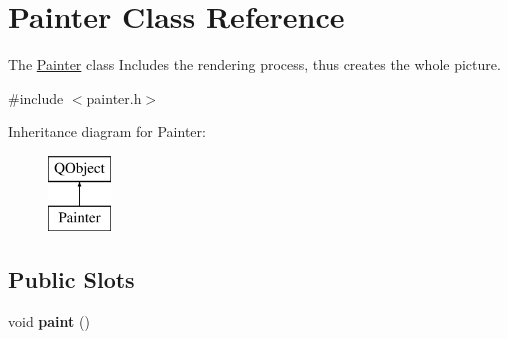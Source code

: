 \hypertarget{class_painter}{}\section{Painter Class Reference}
\label{class_painter}


The \hyperlink{class_painter}{Painter} class  Includes the rendering process, thus creates the whole picture.  




{\ttfamily \#include $<$painter.\+h$>$}

Inheritance diagram for Painter\+:\begin{figure}[H]
\begin{center}
\leavevmode
\includegraphics[height=2.000000cm]{class_painter}
\end{center}
\end{figure}
\subsection*{Public Slots}
\begin{DoxyCompactItemize}
\item 
\hypertarget{class_painter_a5b9b4ed8aebaebeb2f6483e350445fbc}{}void {\bfseries paint} ()\label{class_painter_a5b9b4ed8aebaebeb2f6483e350445fbc}

\end{DoxyCompactItemize}

